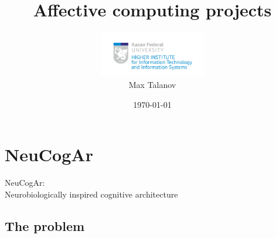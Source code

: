 \documentclass[12pt, aspectratio=169]{beamer}
\title[Neurotechnology]{Affective computing projects} %
\author[Max Talanov]{
  \includegraphics[height=2cm]{ITIS_logo_bright}\\
  Max Talanov
}
\institute[ITIS: KFU]%
{
ITIS, KFU \\ %
\medskip
\textit{max.talanov@gmail.com} %
}
\date{\today} %
\begin{document}
\begin{frame}
\titlepage %
\end{frame}


\section{NeuCogAr}

\begin{frame}
  NeuCogAr:\\
  Neurobiologically inspired cognitive architecture
\end{frame}


\subsection{The problem} %
\end{document}
